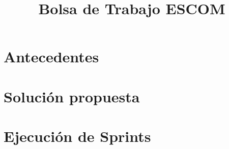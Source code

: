 \documentclass[11pt, twopages]{book}
\date{}
\title{Bolsa de Trabajo ESCOM}
\author{}
\begin{document}
    \frontmatter
        \maketitle
        \tableofcontents
        \listoffigures
        \listoftables
    \mainmatter
    


    \chapter{Antecedentes}
        \label{aloneparts:antecedentes}
        

    \chapter{Solución propuesta}
        \label{aloneparts:propuesta}
        
    
    \chapter{Ejecución de Sprints}
    \label{sprints}
        
        
        
        
        
        
    
        
    \appendix

        
        
        
        
        
        

    \medskip

\printbibliography
\end{document}
